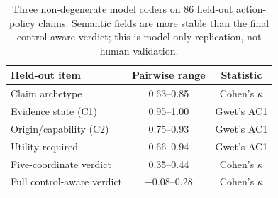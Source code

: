 \begin{table}[t]
\centering
\small
\setlength{\tabcolsep}{3pt}
\begin{tabularx}{\columnwidth}{Xcc}
\toprule
\textbf{Held-out item} & \textbf{Pairwise range} & \textbf{Statistic} \\
\midrule
Claim archetype & 0.63--0.85 & Cohen's $\kappa$ \\
Evidence state (C1) & 0.95--1.00 & Gwet's AC1 \\
Origin/capability (C2) & 0.75--0.93 & Gwet's AC1 \\
Utility required & 0.66--0.94 & Gwet's AC1 \\
Five-coordinate verdict & 0.35--0.44 & Cohen's $\kappa$ \\
Full control-aware verdict & $-0.08$--0.28 & Cohen's $\kappa$ \\
\bottomrule
\end{tabularx}
\caption{Three non-degenerate model coders on 86 held-out action-policy claims. Semantic fields are more stable than the final control-aware verdict; this is model-only replication, not human validation.}
\label{tab:main-heldout-model-reliability}
\end{table}
